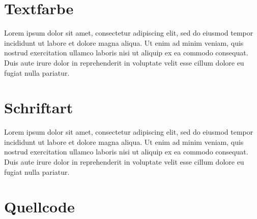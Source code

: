 \documentclass[12pt, a4paper]{article} %
\begin{document}
\section{Textfarbe}


Lorem ipsum dolor sit amet, consectetur adipiscing elit, sed do eiusmod tempor incididunt ut labore et dolore magna aliqua. Ut enim ad minim veniam, quis nostrud exercitation ullamco laboris nisi ut aliquip ex ea commodo consequat. Duis aute irure dolor in reprehenderit in voluptate velit esse cillum dolore eu fugiat nulla pariatur.

\section{Schriftart}



Lorem ipsum dolor sit amet, consectetur adipiscing elit, sed do eiusmod tempor incididunt ut labore et dolore magna aliqua. Ut enim ad minim veniam, quis nostrud exercitation ullamco laboris nisi ut aliquip ex ea commodo consequat. Duis aute irure dolor in reprehenderit in voluptate velit esse cillum dolore eu fugiat nulla pariatur.


\section{Quellcode}


\end{document}
